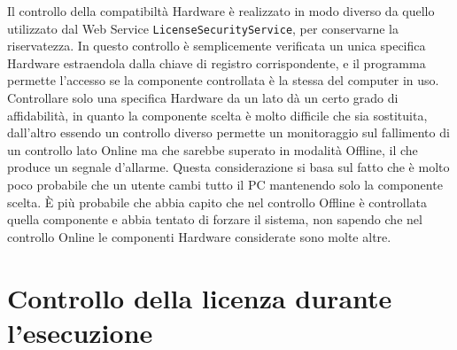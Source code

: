Il controllo della compatibiltà Hardware è realizzato in modo diverso da quello utilizzato dal Web Service \texttt{LicenseSecurityService}, per conservarne la riservatezza. In questo controllo è semplicemente verificata un unica specifica Hardware estraendola dalla chiave di registro corrispondente, e il programma permette l'accesso se la componente controllata è la stessa del computer in uso. Controllare solo una specifica Hardware da un lato dà un certo grado di affidabilità, in quanto la componente scelta è molto difficile che sia sostituita, dall'altro essendo un controllo diverso permette un monitoraggio sul fallimento di un controllo lato Online ma che sarebbe superato in modalità Offline, il che produce un segnale d'allarme. Questa considerazione si basa sul fatto che è molto poco probabile che un utente cambi tutto il PC mantenendo solo la componente scelta. È più probabile che abbia capito che nel controllo Offline è controllata quella componente e abbia tentato di forzare il sistema, non sapendo che nel controllo Online le componenti Hardware considerate sono molte altre.


\section{Controllo della licenza durante l'esecuzione}
\label{uniqueid}

